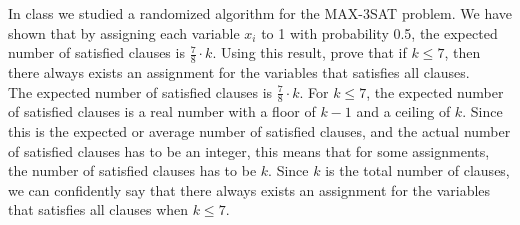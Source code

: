\documentclass[paper=a4, fontsize=11pt]{scrartcl} %
\numberwithin{figure}{section} %
\numberwithin{table}{section} %
\begin{document}
\begin{enumerate}
In class we studied a randomized algorithm for the MAX-3SAT problem. We have shown
that by assigning each variable $x_i$ to 1 with probability 0.5, the expected number of satisfied clauses is $\frac{7}{8} \cdot k$. Using this result, prove that if $k \leq 7$, then there always exists an assignment for the variables that satisfies all clauses.\\

The expected number of satisfied clauses is $\frac{7}{8} \cdot k$. For $k \leq 7$,  the expected number of satisfied clauses is a real number with a floor of $k-1$ and a ceiling of $k$. Since this is the expected or average number of satisfied clauses, and the actual number of satisfied clauses has to be an integer, this means that for some assignments, the number of satisfied clauses has to be $k$. Since $k$ is the total number of clauses, we can confidently say that there always exists an assignment for the variables that satisfies all clauses when $k \leq 7$.
\end{enumerate}

\end{document}
